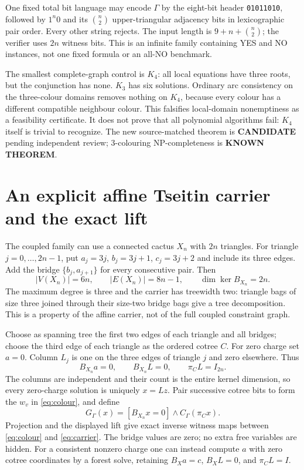 \documentclass[11pt]{article}
\newcommand{\KNOWN}{\textbf{KNOWN THEOREM}}
\newcommand{\CAND}{\textbf{CANDIDATE}}
\begin{document}
One fixed total bit language may encode $\Gamma$ by the eight-bit header
\texttt{01011010}, followed by $1^n0$ and its $\binom n2$ upper-triangular
adjacency bits in lexicographic pair order. Every other string rejects.
The input length is $9+n+\binom n2$; the verifier uses $2n$ witness bits.
This is an infinite family containing YES and NO instances, not one fixed
formula or an all-NO benchmark.

The smallest complete-graph control is $K_4$: all local equations have three
roots, but the conjunction has none. $K_3$ has six solutions. Ordinary arc
consistency on the three-colour domains removes nothing on $K_4$, because
every colour has a different compatible neighbour colour. This falsifies
local-domain nonemptiness as a feasibility certificate. It does not prove
that all polynomial algorithms fail: $K_4$ itself is trivial to recognize.
The new source-matched theorem is \CAND{} pending independent review;
3-colouring NP-completeness is \KNOWN{}.

\section{An explicit affine Tseitin carrier and the exact lift}
The coupled family can use a connected cactus $X_n$ with $2n$ triangles.
For triangle $j=0,\ldots,2n-1$, put
$a_j=3j$, $b_j=3j+1$, $c_j=3j+2$ and include its three edges. Add the bridge
$\{b_j,a_{j+1}\}$ for every consecutive pair. Then
\[
 |V(X_n)|=6n,\qquad |E(X_n)|=8n-1,\qquad
 \dim\ker B_{X_n}=2n.
\]
The maximum degree is three and the carrier has treewidth two: triangle
bags of size three joined through their size-two bridge bags give a tree
decomposition. This is a property of the affine carrier, not of the full
coupled constraint graph.

Choose as spanning tree the first two edges of each triangle and all
bridges; choose the third edge of each triangle as the ordered cotree $C$.
For zero charge set $a=0$. Column $L_j$ is one on the three edges of triangle
$j$ and zero elsewhere. Thus
\[
 B_{X_n}a=0,\qquad B_{X_n}L=0,\qquad \pi_CL=I_{2n}.
\]
The columns are independent and their count is the entire kernel dimension,
so every zero-charge solution is uniquely $x=Lz$. Pair successive cotree
bits to form the $w_v$ in \eqref{eq:colour}, and define
\begin{equation}\label{eq:carrier}
 G_\Gamma(x)=[B_{X_n}x=0]\land C_\Gamma(\pi_Cx).
\end{equation}
Projection and the displayed lift give exact inverse witness maps between
\eqref{eq:colour} and \eqref{eq:carrier}. The bridge values are zero; no
extra free variables are hidden. For a consistent nonzero charge one can
instead compute $a$ with zero cotree coordinates by a forest solve, retaining
$B_Xa=c$, $B_XL=0$, and $\pi_CL=I$.
\end{document}
